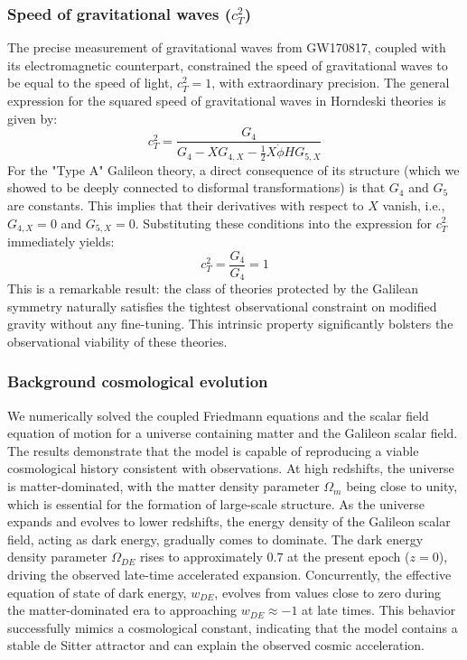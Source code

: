 \documentclass[twocolumn]{aastex631}
\begin{document}
\subsubsection{Speed of gravitational waves ($c_T^2$)}
The precise measurement of gravitational waves from GW170817, coupled with its electromagnetic counterpart, constrained the speed of gravitational waves to be equal to the speed of light, $c_T^2 = 1$, with extraordinary precision. The general expression for the squared speed of gravitational waves in Horndeski theories is given by:
\begin{equation}
    c_T^2 = \frac{G_4}{G_4 - X G_{4,X} - \frac{1}{2}X\dot{\phi}H G_{5,X}}
\end{equation}
For the "Type A" Galileon theory, a direct consequence of its structure (which we showed to be deeply connected to disformal transformations) is that $G_4$ and $G_5$ are constants. This implies that their derivatives with respect to $X$ vanish, i.e., $G_{4,X} = 0$ and $G_{5,X} = 0$. Substituting these conditions into the expression for $c_T^2$ immediately yields:
\begin{equation}
    c_T^2 = \frac{G_4}{G_4} = 1
\end{equation}
This is a remarkable result: the class of theories protected by the Galilean symmetry naturally satisfies the tightest observational constraint on modified gravity without any fine-tuning. This intrinsic property significantly bolsters the observational viability of these theories.

\subsubsection{Background cosmological evolution}
We numerically solved the coupled Friedmann equations and the scalar field equation of motion for a universe containing matter and the Galileon scalar field. The results demonstrate that the model is capable of reproducing a viable cosmological history consistent with observations. At high redshifts, the universe is matter-dominated, with the matter density parameter $\Omega_m$ being close to unity, which is essential for the formation of large-scale structure. As the universe expands and evolves to lower redshifts, the energy density of the Galileon scalar field, acting as dark energy, gradually comes to dominate. The dark energy density parameter $\Omega_{DE}$ rises to approximately $0.7$ at the present epoch ($z=0$), driving the observed late-time accelerated expansion. Concurrently, the effective equation of state of dark energy, $w_{DE}$, evolves from values close to zero during the matter-dominated era to approaching $w_{DE} \approx -1$ at late times. This behavior successfully mimics a cosmological constant, indicating that the model contains a stable de Sitter attractor and can explain the observed cosmic acceleration.
\end{document}
